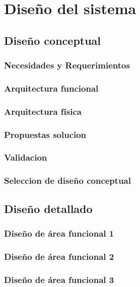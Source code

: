 
\chapter{Diseño del sistema}

\section{Diseño conceptual}

\subsection{Necesidades y Requerimientos}

\subsection{Arquitectura funcional}

\subsection{Arquitectura física}

\subsection{Propuestas solucion}

\subsection{Validacion}

\subsection{Seleccion de diseño conceptual}


\section{Diseño detallado}

\subsection{Diseño de área funcional 1}

\subsection{Diseño de área funcional 2}

\subsection{Diseño de área funcional 3}


\newpage

